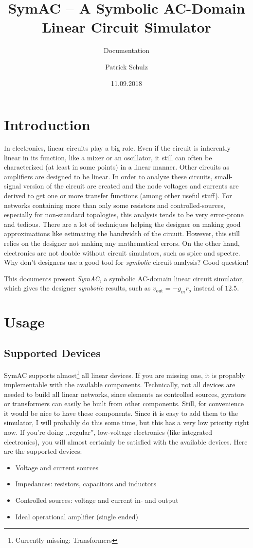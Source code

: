 \documentclass[titlepage]{scrartlc}
\title{SymAC -- A Symbolic AC-Domain Linear Circuit Simulator}
\subtitle{Documentation}
\author{Patrick Schulz}
\date{11.09.2018}
\begin{document}
    \maketitle
    \section{Introduction}
    In electronics, linear circuits play a big role. Even if the circuit is inherently linear in its function, like a mixer or an oscillator, it still can often be characterized (at least in some
    points) in a linear manner. Other circuits as amplifiers are designed to be linear. In order to analyze these circuits, small-signal version of the circuit are created and the node voltages and 
    currents are derived to get one or more transfer functions (among other useful stuff). For networks containing more than only some resistors and controlled-sources, especially for non-standard
    topologies, this analysis tends to be very error-prone and tedious. There are a lot of techniques helping the designer on making good approximations like estimating the bandwidth of the circuit.
    However, this still relies on the designer not making any mathematical errors. On the other hand, electronics are not doable without circuit simulators, such as spice and spectre. Why don't 
    designers use a good tool for \emph{symbolic} circuit analysis? Good question!

    This documents present \emph{SymAC}, a symbolic AC-domain linear circuit simulator, which gives the designer \emph{symbolic} results, such as $v_\mathrm{out} = -g_m r_o$ instead of $12.5$.
    \section{Usage}
        \subsection{Supported Devices}
        SymAC supports almost\footnote{Currently missing: Transformers} all linear devices. If you are missing one, it is propably implementable with the available components. Technically, not all
        devices are needed to build all linear networks, since elements as controlled sources, gyrators or transformers can easily be built from other components. Still, for convenience it would
        be nice to have these components. Since it is easy to add them to the simulator, I will probably do this some time, but this has a very low priority right now. If you're doing ,,regular'',
        low-voltage electronics (like integrated electronics), you will almost certainly be satisfied with the available devices. Here are the supported devices:
        \begin{itemize}
            \item Voltage and current sources
            \item Impedances: resistors, capacitors and inductors
            \item Controlled sources: voltage and current in- and output
            \item Ideal operational amplifier (single ended)
        \end{itemize}
\end{document}
